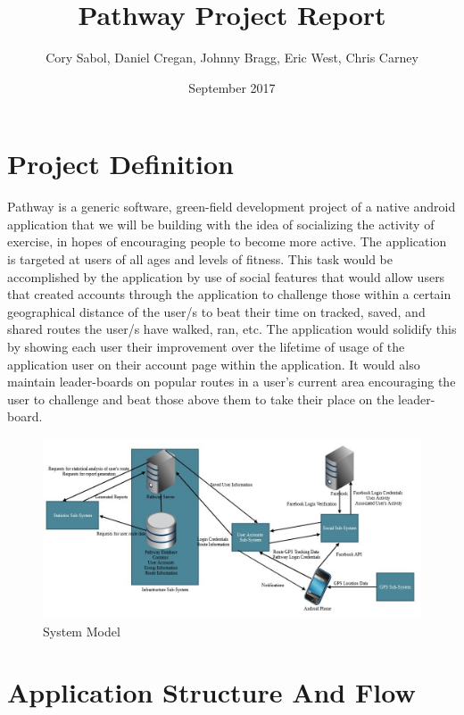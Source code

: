 \documentclass{article}
\title{Pathway Project Report}
\author{Cory Sabol, Daniel Cregan, Johnny Bragg, Eric West, Chris Carney}
\date{September 2017}
\begin{document}
\maketitle

\pagebreak

\tableofcontents

\pagebreak

\section{Project Definition}
Pathway is a generic software, green-field development project of a native android application that we will be building with the idea of socializing the activity of exercise, in hopes of encouraging people to become more active. The application is targeted at users of all ages and levels of fitness. This task would be accomplished by the application by use of social features that would allow users that created accounts through the application to challenge those within a certain geographical distance of the user/s to beat their time on tracked, saved, and shared routes the user/s have walked, ran, etc. The application would solidify this by showing each user their improvement over the lifetime of usage of the application user on their account page within the application. It would also maintain leader-boards on popular routes in a user's current area encouraging the user to challenge and beat those above them to take their place on the leader-board.
\begin{figure}[!htb]
    \centering
    \includegraphics[width=\textwidth]{system_model.jpg}
    \caption{System Model}
    \label{fig:my_label}
\end{figure}

\pagebreak


\section{Application Structure And Flow}
\end{document}
